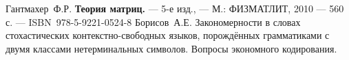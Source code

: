 \documentclass[11pt]{article}
\begin{document}
    


\begin{thebibliography}{99}
        Гантмахер~Ф.Р. \textbf{Теория матриц.} --- 5-е изд., --- М.: ФИЗМАТЛИТ, 2010 --- 560 с. --- ISBN~978-5-9221-0524-8
        Борисов~А.Е. Закономерности в словах стохастических контекстно-свободных языков, порождённых грамматиками с двумя классами нетерминальных символов. Вопросы экономного кодирования.
\end{thebibliography}
\end{document}
